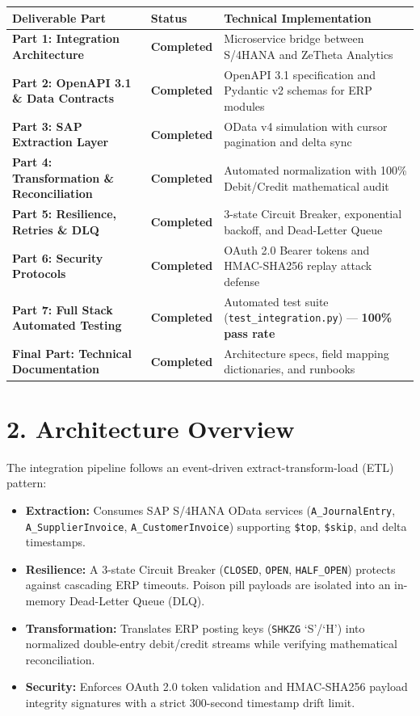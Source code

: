 \documentclass[11pt,a4paper]{article}
\begin{document}
\begin{table}[h]
\centering
\scriptsize
\begin{tabular}{@{}llp{8cm}@{}}
\toprule
\textbf{Deliverable Part} & \textbf{Status} & \textbf{Technical Implementation} \\ \midrule
\textbf{Part 1: Integration Architecture} & \textbf{Completed} & Microservice bridge between S/4HANA and ZeTheta Analytics \\
\textbf{Part 2: OpenAPI 3.1 \& Data Contracts} & \textbf{Completed} & OpenAPI 3.1 specification and Pydantic v2 schemas for ERP modules \\
\textbf{Part 3: SAP Extraction Layer} & \textbf{Completed} & OData v4 simulation with cursor pagination and delta sync \\
\textbf{Part 4: Transformation \& Reconciliation} & \textbf{Completed} & Automated normalization with 100\% Debit/Credit mathematical audit \\
\textbf{Part 5: Resilience, Retries \& DLQ} & \textbf{Completed} & 3-state Circuit Breaker, exponential backoff, and Dead-Letter Queue \\
\textbf{Part 6: Security Protocols} & \textbf{Completed} & OAuth 2.0 Bearer tokens and HMAC-SHA256 replay attack defense \\
\textbf{Part 7: Full Stack Automated Testing} & \textbf{Completed} & Automated test suite (\texttt{test\_integration.py}) — \textbf{100\% pass rate} \\
\textbf{Final Part: Technical Documentation} & \textbf{Completed} & Architecture specs, field mapping dictionaries, and runbooks \\ \bottomrule
\end{tabular}
\end{table}

\section{2. Architecture Overview}
The integration pipeline follows an event-driven extract-transform-load (ETL) pattern:
\begin{itemize}[leftmargin=1.5em, itemsep=2pt]
    \item \textbf{Extraction:} Consumes SAP S/4HANA OData services (\texttt{A\_JournalEntry}, \texttt{A\_SupplierInvoice}, \texttt{A\_CustomerInvoice}) supporting \texttt{\$top}, \texttt{\$skip}, and delta timestamps.
    \item \textbf{Resilience:} A 3-state Circuit Breaker (\texttt{CLOSED}, \texttt{OPEN}, \texttt{HALF\_OPEN}) protects against cascading ERP timeouts. Poison pill payloads are isolated into an in-memory Dead-Letter Queue (DLQ).
    \item \textbf{Transformation:} Translates ERP posting keys (\texttt{SHKZG} `S'/`H') into normalized double-entry debit/credit streams while verifying mathematical reconciliation.
    \item \textbf{Security:} Enforces OAuth 2.0 token validation and HMAC-SHA256 payload integrity signatures with a strict 300-second timestamp drift limit.
\end{itemize}
\end{document}
